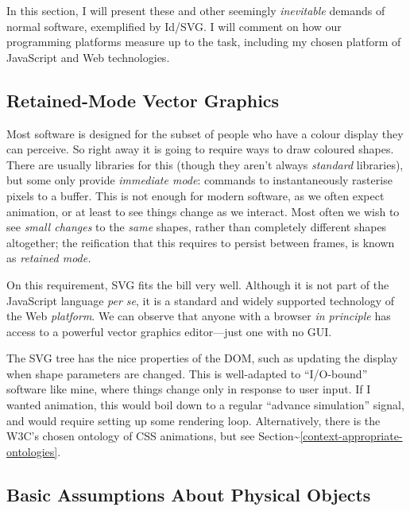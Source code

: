 In this section, I will present these and other seemingly
\emph{inevitable} demands of normal software, exemplified by Id{}/SVG. I
will comment on how our programming platforms measure up to the task,
including my chosen platform of JavaScript and Web technologies.

\hypertarget{retained-mode-vector-graphics}{%
\subsection{Retained-Mode Vector
Graphics}\label{retained-mode-vector-graphics}}

Most software is designed for the subset of people who have a colour
display they can perceive. So right away it is going to require ways to
draw coloured shapes. There are usually libraries for this (though they
aren't always \emph{standard} libraries), but some only provide
\emph{immediate mode}: commands to instantaneously rasterise pixels to a
buffer. This is not enough for modern software, as we often expect
animation, or at least to see things change as we interact. Most often
we wish to see \emph{small changes} to the \emph{same} shapes, rather
than completely different shapes altogether; the reification that this
requires to persist between frames, is known as \emph{retained mode.}

On this requirement, SVG fits the bill very well. Although it is not
part of the JavaScript language \emph{per se}, it is a standard and
widely supported technology of the Web \emph{platform}. We can observe
that anyone with a browser \emph{in principle} has access to a powerful
vector graphics editor---just one with no GUI.

The SVG tree has the nice properties of the DOM, such as updating the
display when shape parameters are changed. This is well-adapted to
``I/O-bound'' software like mine, where things change only in response
to user input. If I wanted animation, this would boil down to a regular
``advance simulation'' signal, and would require setting up some
rendering loop. Alternatively, there is the W3C's chosen ontology of CSS
animations, but see
Section\textasciitilde{}\ref{context-appropriate-ontologies}.

\hypertarget{basic-assumptions-about-physical-objects}{%
\subsection{Basic Assumptions About Physical
Objects}\label{basic-assumptions-about-physical-objects}}


